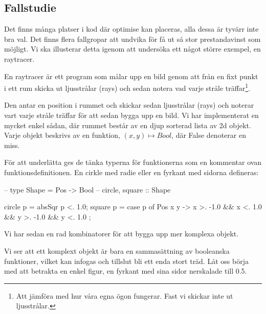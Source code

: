 \documentclass[../Optimise]{subfiles}
\begin{document}
\subsection{Fallstudie}

Det finns många platser i kod där optimise kan placeras, alla dessa är tyvärr inte bra val. Det finns flera fallgropar att undvika för få ut så stor prestandavinst som möjligt. Vi ska illusterar detta igenom att undersöka ett något större exempel, en raytracer.

En raytracer är ett program som målar upp en bild genom att från en fixt punkt i ett rum skicka ut ljusstrålar (rays) och sedan notera vad varje stråle träffar\footnote{Att jämföra med hur våra egna ögon fungerar. Fast vi skickar inte ut ljusstrålar.}.


 Den antar en position i rummet och skickar sedan ljusstrålar (rays) och noterar vart varje stråle träffar för att sedan bygga upp en bild. Vi har implementerat en mycket enkel sådan, där rummet består av en djup sorterad lista av 2d objekt. Varje objekt beskrivs av en funktion, $(x,y) \mapsto Bool$, där False denoterar en miss.
 

För att underlätta ges de tänka typerna för funktionerna som en kommentar ovan funktionsdefinitionen.
En cirkle med radie  eller en fyrkant med sidorna  defineras:
\begin{codeEx}
-- type Shape = Pos -> Bool
-- circle, square :: Shape

circle p = absSqr p <. 1.0;
square p = case p of
    { Pos x y -> x >. -1.0 && x <. 1.0
              && y >. -1.0 && y <. 1.0
    };

\end{codeEx}

Vi har sedan en rad kombinatorer för att bygga upp mer komplexa objekt.


Vi ser att ett komplext objekt är bara en sammasättning av booleanska funktioner, vilket kan infogas och tillslut bli ett enda stort  träd. 
Låt oss börja med att betrakta en enkel figur, en fyrkant med sina sidor nerskalade till 0.5.
\end{document}
